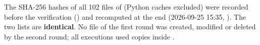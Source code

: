 The SHA-256 hashes of all 102 files of  (Python caches excluded) were recorded before the verification
() and recomputed at the end (2026-09-25 15:35, ).
The two lists are \textbf{identical}. No file of the first round was created, modified or deleted by the second round;
all executions used copies inside .
